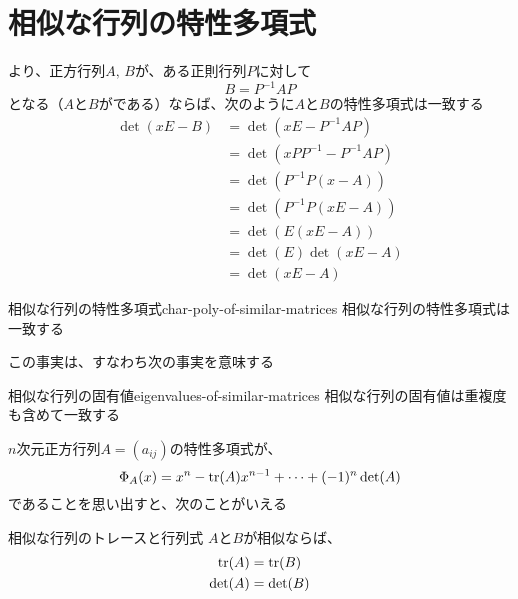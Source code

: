 \documentclass[../../../topic_linear-algebra]{subfiles}
\begin{document}
\sectionline
\section{相似な行列の特性多項式}

より、正方行列$A,\,B$が、ある正則行列$P$に対して
\begin{equation*}
  B = P^{-1}AP
\end{equation*}
となる（$A$と$B$がである）ならば、次のように$A$と$B$の特性多項式は一致する
\begin{align*}
  \det(xE - B) & = \det(xE - P^{-1}AP)       \\
               & = \det(xPP^{-1} - P^{-1}AP) \\
               & = \det(P^{-1}P(x - A))      \\
               & = \det(P^{-1}P(xE - A))     \\
               & = \det(E(xE - A))           \\
               & = \det(E)\det(xE - A)       \\
               & = \det(xE - A)
\end{align*}

\begin{theorem}{相似な行列の特性多項式}{char-poly-of-similar-matrices}
  相似な行列の特性多項式は一致する
\end{theorem}

この事実は、すなわち次の事実を意味する

\begin{theorem}{相似な行列の固有値}{eigenvalues-of-similar-matrices}
  相似な行列の固有値は重複度も含めて一致する
\end{theorem}

\sectionline

$n$次元正方行列$A = (a_{ij})$の特性多項式が、
\begin{equation*}
  \Phi_A(x) = x^n - \tr(A)x^{n-1} + \cdots + (-1)^n \det(A)
\end{equation*}
であることを思い出すと、次のことがいえる

\begin{theorem*}{相似な行列のトレースと行列式}
  $A$と$B$が相似ならば、
  \begin{align*}
    \tr(A)  & = \tr(B)  \\
    \det(A) & = \det(B)
  \end{align*}
\end{theorem*}
\end{document}
